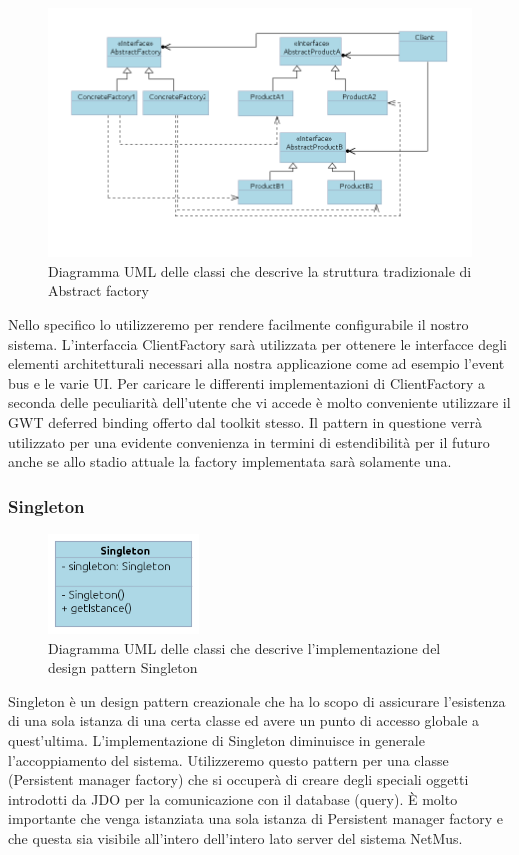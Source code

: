 \begin{figure}[h]
\centering
\includegraphics[width=16.5cm]{img/ST/AbstractFactory.png}
\caption{Diagramma UML delle classi che descrive la struttura tradizionale di
Abstract factory}
\end{figure}
Nello specifico lo utilizzeremo per rendere facilmente configurabile il nostro
sistema. L'interfaccia ClientFactory sar\`a utilizzata per ottenere le
interfacce degli elementi architetturali necessari alla nostra applicazione come
ad esempio l'event bus e le varie UI.
Per caricare le differenti implementazioni di ClientFactory a seconda delle
peculiarit\`a dell'utente che vi accede \`e molto conveniente utilizzare il GWT
deferred binding offerto dal toolkit stesso.
Il pattern in questione verr\`a utilizzato per una evidente convenienza in termini
di estendibilit\`a per il futuro anche se allo stadio attuale la factory
implementata sar\`a solamente una.

\newpage
\subsubsection{Singleton}
\begin{figure}[h]
\centering
\includegraphics[width=4cm]{img/ST/Singleton.png}
\caption{Diagramma UML delle classi che descrive l'implementazione del design
pattern Singleton}
\end{figure}
Singleton \`e un design pattern creazionale che ha lo scopo di assicurare
l'esistenza di una sola istanza di una certa classe ed avere un punto di accesso
globale a quest'ultima. 
L'implementazione di Singleton diminuisce in generale l'accoppiamento del
sistema.
Utilizzeremo questo pattern per una classe (Persistent manager factory) che si
occuper\`a di creare degli speciali oggetti introdotti da JDO per la
comunicazione con il database (query). \`E molto importante che venga istanziata una sola
istanza di Persistent manager factory e che questa sia visibile all'intero
dell'intero lato server del sistema NetMus. 

